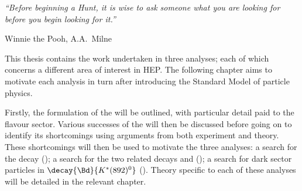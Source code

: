 
\begin{minipage}{\textwidth}
  {\it ``Before beginning a Hunt, it is wise to ask someone what you are looking for before you
  begin looking for it.''}

  {\hfill Winnie the Pooh, A.A.~Milne}
\end{minipage}

\vspace{2em}

This thesis contains the work undertaken in three analyses; each of which concerns a different area
of interest in \gls{HEP}.
The following chapter aims to motivate each analysis in turn after introducing the Standard Model
of particle physics.

Firstly, the formulation of the \sm will be outlined, with particular detail paid to the flavour
sector.
Various successes of the \sm will then be discussed before going on to identify its shortcomings
using arguments from both experiment and theory.
These shortcomings will then be used to motivate the three analyses:
a search for the decay \btodsphi ();
a search for the two related decays \btokpipimumu and \btophikmumu ();
a search for dark sector particles in $\decay{\Bd}{K^*(892)^0}$ ().
Theory specific to each of these analyses will be detailed in the relevant chapter.


